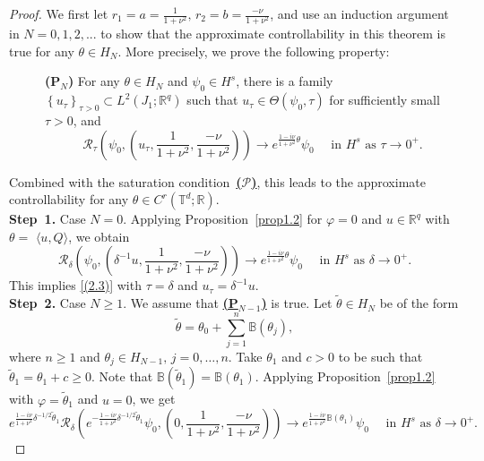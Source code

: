 \documentclass[10pt,a4paper]{amsart}
\def \geq{\geqslant}
\begin{document}
\begin{proof}
We first let $ r_1=a=\frac{1}{1+\nu^2},\, r_2 = b =\frac{-\nu}{1+\nu^2} $, and
use an induction argument in $N=0,1,2,...$ to show that the approximate controllability in this theorem is true for any $\theta \in H_N$. 
More precisely, we prove the following property:
\begin{description}\item[\hypertarget{PN}]{\textbf{(P$_N$)}}  
For any $\theta \in H_N$ and $\psi_0 \in H^s$, there is a family $\left\{u_\tau\right\}_{\tau>0} \subset L^2\left(J_1 ; \mathbb{R}^q\right)$ such that $u_\tau \in \Theta\left(\psi_0, \tau\right)$ for sufficiently small $\tau>0$, and
\begin{equation}\label{(2.3)}
\mathcal{R}_\tau\left(\psi_0, \left(u_\tau,\frac{1}{1+\nu^2},\frac{-\nu}{1+\nu^2}\right)\right) \rightarrow e^{\frac{1-i\nu}{1+\nu^2} \theta} \psi_0 \quad \text { in } H^s \text { as } \tau \rightarrow 0^{+}.
\end{equation}
\end{description} 
Combined with the saturation condition~{\hyperlink{H1}{\textbf{($\mathscr{P}$)}}}, this leads to the approximate controllability for any $\theta \in C^r\left(\mathbb{T}^d ; \mathbb{R}\right)$.
\\
\textbf{Step~1.} Case $N=0$. Applying Proposition~\ref{prop1.2} for $\varphi=0$ and $u \in \mathbb{R}^q$ with $\theta=$ $\langle u, Q\rangle$, we obtain
$$
\mathcal{R}_\delta\left(\psi_0, \left(\delta^{-1} u,\frac{1}{1+\nu^2},\frac{-\nu}{1+\nu^2}\right)\right) \rightarrow e^{\frac{1-i\nu}{1+\nu^2} \theta } \psi_0 \quad \text { in } H^s \text { as } \delta \rightarrow 0^{+}.
$$
This implies \eqref{(2.3)} with $\tau=\delta$ and $u_\tau=\delta^{-1} u$.
\\
\textbf{Step~2.} Case $N \geq 1$. We assume that \hyperlink{PN}{\textbf{(P$_{N-1}$)}} is true. Let $\tilde{\theta} \in H_N$ be of the form
$$
\tilde{\theta}=\theta_0+\sum_{j=1}^n \mathbb{B}\left(\theta_j\right),
$$
where $n \geq 1$ and $\theta_j \in H_{N-1},\, j=0, \ldots, n$.
Take $ \theta_1 $ and $ c>0 $ to be such that $ \tilde{\theta}_1=\theta_1 +c\geq0 $. Note that $ \mathbb{B}(\tilde{\theta}_1) = \mathbb{B}(\theta_1) $. Applying Proposition~\ref{prop1.2} with $\varphi=\tilde{\theta}_1$ and $u=0$, we get
\begin{equation*}\label{(2.4)}
e^{\frac{1-i\nu}{1+\nu^2}\delta^{-1 / 2} \tilde{\theta}_1} \mathcal{R}_\delta\left(e^{-\frac{1-i\nu}{1+\nu^2} \delta^{-1 / 2} \tilde{\theta}_1} \psi_0, \left(0,\frac{1}{1+\nu^2},\frac{-\nu}{1+\nu^2}\right)\right) \rightarrow e^{\frac{1-i\nu}{1+\nu^2} \mathbb{B}\left(\theta_1\right)} \psi_0 \quad \text { in } H^s \text { as } \delta \rightarrow 0^{+} .

\end{equation*}
\end{proof}
\end{document}
